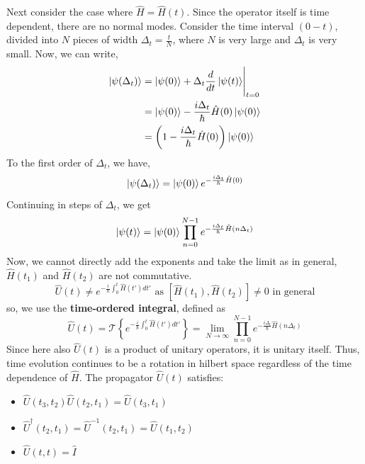 \documentclass[12pt,a4paper]{report}
\newcommand{\der}[2]{\frac{d#1}{d#2}}
\newcommand{\timeorder}{\mathcal{T}}
\begin{document}
Next consider the case where $\hat{H} = \hat{H}(t)$. Since the operator itself is time dependent, there are no normal modes.
Consider the time interval $(0-t)$, divided into $N$ pieces of width $\Delta_t = \frac{t}{N}$, where $N$ is very large and $\Delta_t$
is very small. Now, we can write,
\begin{align*}
    \ket{\psi(\Delta_t)} &= \ket{\psi(0)} + \Delta_t \der{}{t} \ket{\psi(t)}\Biggr |_{t=0} \\
    &= \ket{\psi(0)} - \frac{i\Delta_t}{\hbar} \hat{H}(0) \ket{\psi(0)} \\
    &= \left(1 - \frac{i\Delta_t}{\hbar} \hat{H}(0) \right) \ket{\psi(0)}
\end{align*}
To the first order of $\Delta_t$, we have,
\begin{equation*}
    \ket{\psi(\Delta_t)} = \ket{\psi(0)}e^{-\frac{i\Delta_t}{\hbar} \hat{H}(0)}
\end{equation*}
Continuing in steps of $\Delta_t$, we get
\begin{equation*}
    \ket{\psi(t)} = \ket{\psi(0)}\prod_{n=0}^{N-1} e^{-\frac{i\Delta_t}{\hbar} \hat{H}(n\Delta_t)}
\end{equation*}
Now, we cannot directly add the exponents and take the limit as in general, $\hat{H}(t_1)$ and $\hat{H}(t_2)$ are not commutative.
\begin{equation*}
    \hat{U}(t) \neq e^{-\frac{i}{\hbar} \int_{0}^{t} \hat{H}(t') dt'} \text{ as } [\hat{H}(t_1), \hat{H}(t_2)] \neq 0 \text{ in general}
\end{equation*}
so, we use the \textbf{time-ordered integral}, defined as
\begin{equation*}
    \hat{U}(t) = \timeorder\left\{ e^{-\frac{i}{\hbar} \int_{0}^{t} \hat{H}(t') dt'} \right\} = \lim_{N\to\infty} \prod_{n=0}^{N-1} e^{-\frac{i\Delta_t}{\hbar} \hat{H}(n\Delta_t)}
\end{equation*}
Since here also $\hat{U}(t)$ is a product of unitary operators, it is unitary itself. Thus, time evolution continues to be a rotation in hilbert space regardless of the time dependence of $\hat{H}$.
The propagator $\hat{U}(t)$ satisfies:
\begin{itemize}
    \item $\hat{U}(t_3, t_2)\hat{U}(t_2, t_1) = \hat{U}(t_3, t_1)$
    \item $\hat{U}^\dagger(t_2, t_1) = \hat{U}^{-1}(t_2, t_1) = \hat{U}(t_1, t_2)$
    \item $\hat{U}(t, t) = \hat{I}$
\end{itemize}
\end{document}
